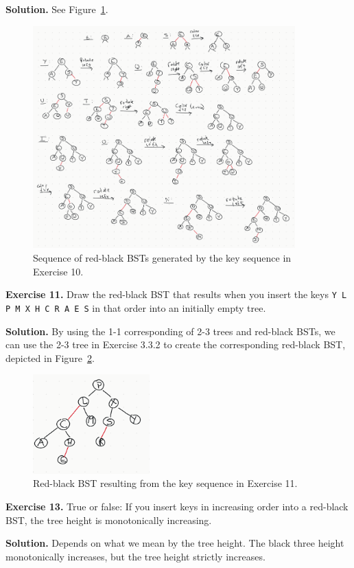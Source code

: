 \documentclass[12pt, a4paper]{article}
\newenvironment{ex}[2][Exercise]
{\par\medskip\noindent \textbf{#1 #2.}}
{\medskip}
\newenvironment{sol}[1][Solution]
{\par\medskip\noindent \textbf{#1.} }
{\medskip}
\begin{document}
	\begin{sol}
		 See Figure~\ref{fig:ex-10}.
		 \begin{figure}
		 	\centering
		 	\includegraphics[width=0.9\textwidth]{exercise-10}
		 	\caption{Sequence of red-black BSTs generated by the key sequence in Exercise 10.}
		 	\label{fig:ex-10}
		 \end{figure}
	\end{sol}
	\begin{ex}{11}
		Draw the red-black BST that results when you insert the keys
		\texttt{Y L P M X H C R A E S} in that order into an initially empty tree.
	\end{ex}
	\begin{sol}
		By using the 1-1 corresponding of 2-3 trees and red-black BSTs, we can use the 2-3
		tree in Exercise 3.3.2 to create the corresponding red-black BST, depicted
		in Figure~\ref{fig:ex-11}.
		\begin{figure}
			\centering
			\includegraphics[width=0.4\textwidth]{exercise-11}
			\caption{Red-black BST resulting from the key sequence in Exercise 11.}
			\label{fig:ex-11}
		\end{figure}
	\end{sol}
	\begin{ex}{13}
		True or false: If you insert keys in increasing order into a red-black BST, the tree
		height is monotonically increasing.
	\end{ex}
	\begin{sol}
		Depends on what we mean by the tree height. The black three height monotonically
		increases, but the tree height strictly increases.
	\end{sol}
	
	\pagebreak
	\printbibliography
\end{document}
